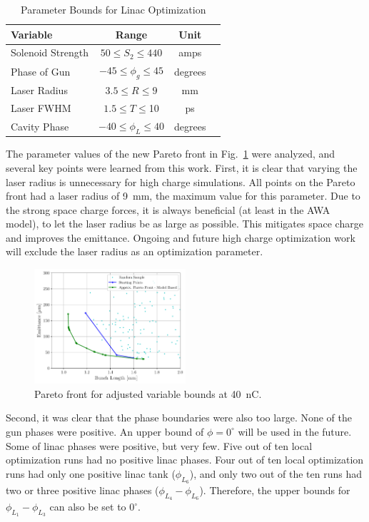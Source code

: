\documentclass[letterpaper,  %
              ]{jacow-2_3}   %
\begin{document}
\begin{table}[hbt] 
	\centering
	\caption{Parameter Bounds for Linac Optimization}
	\begin{tabular}{ l *{3}{c}}
		\toprule
		\textbf{Variable} & \textbf{Range} & \textbf{Unit} \\
		\midrule
		Solenoid Strength & $ 50 \le S_2 \le 440$  & amps \\
		Phase of Gun & $-45 \le \phi_g \le 45$  & degrees \\
		Laser Radius  & $3.5 \le R \le 9$  & mm \\
		Laser FWHM & $1.5 \le T \le $10  & ps \\
		Cavity Phase & $-40 \le \phi_L \le 40$  & degrees \\
		\bottomrule	
	\end{tabular}	
	\label{bounds}
\end{table}

The parameter values of the new Pareto front in Fig.~\ref{paretob} were analyzed, and 
several key points were learned from this work. 
First, it is clear that varying the laser radius is unnecessary for 
high charge simulations. All points on the Pareto front
had a laser radius of \SI{9}{mm}, the maximum value for this parameter.
Due to the strong space charge forces, 
it is always beneficial (at least in the AWA model), to let the 
laser radius be as large as possible.  This mitigates space charge
and improves the emittance. Ongoing and future high charge optimization 
work will exclude the laser radius as an optimization parameter.
\begin{figure}
	\includegraphics[width=0.5\textwidth]{pareto_emittance_vs_zrms}
	\caption{Pareto front for adjusted variable bounds at \SI{40}{nC}. }
	\label{paretob}
\end{figure}

Second, it was clear that the phase boundaries were also too large.
None of the gun phases were positive. An upper bound of $\phi = 0^{\circ}$
will be used in the future. Some of linac phases were positive, 
but very few. Five out of ten local optimization runs had no positive linac 
phases. Four out of ten local optimization runs had only one positive 
linac tank ($\phi_{L_6}$), and only two out of the ten runs had two or three
positive linac phases ($\phi_{L_4}-\phi_{L_6}$). Therefore, the upper bounds for 
$\phi_{L_1}-\phi_{L_3}$ can also be set to $0^{\circ}$. 
\end{document}
